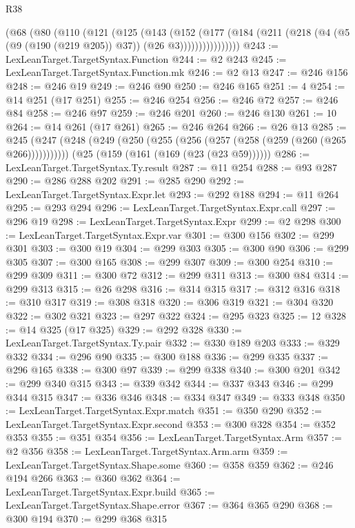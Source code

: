 \begin{lexlean}{R38}
\begin{coremodule}
          (@68
            (@80
              (@110
                (@121
                  (@125
                    (@143
                      (@152
                        (@177
                          (@184
                            (@211 (@218 (@4 (@5 (@9 (@190 (@219 @205)) @37)) (@26 @3))))))))))))))))
@243 := LexLeanTarget.TargetSyntax.Function
@244 := @2 @243
@245 := LexLeanTarget.TargetSyntax.Function.mk
@246 := @2 @13
@247 := @246 @156
@248 := @246 @19
@249 := @246 @90
@250 := @246 @165
@251 := 4
@254 := @14 @251 (@17 @251)
@255 := @246 @254
@256 := @246 @72
@257 := @246 @84
@258 := @246 @97
@259 := @246 @201
@260 := @246 @130
@261 := 10
@264 := @14 @261 (@17 @261)
@265 := @246 @264
@266 := @26 @13
@285 := @245
    (@247 (@248 (@249 (@250 (@255 (@256 (@257 (@258 (@259 (@260 (@265 @266)))))))))))
    (@25 (@159 (@161 (@169 (@23 (@23 @59))))))
@286 := LexLeanTarget.TargetSyntax.Ty.result
@287 := @11 @254
@288 := @93 @287
@290 := @286 @288 @202
@291 := @285 @290
@292 := LexLeanTarget.TargetSyntax.Expr.let
@293 := @292 @188
@294 := @11 @264
@295 := @293 @294
@296 := LexLeanTarget.TargetSyntax.Expr.call
@297 := @296 @19
@298 := LexLeanTarget.TargetSyntax.Expr
@299 := @2 @298
@300 := LexLeanTarget.TargetSyntax.Expr.var
@301 := @300 @156
@302 := @299 @301
@303 := @300 @19
@304 := @299 @303
@305 := @300 @90
@306 := @299 @305
@307 := @300 @165
@308 := @299 @307
@309 := @300 @254
@310 := @299 @309
@311 := @300 @72
@312 := @299 @311
@313 := @300 @84
@314 := @299 @313
@315 := @26 @298
@316 := @314 @315
@317 := @312 @316
@318 := @310 @317
@319 := @308 @318
@320 := @306 @319
@321 := @304 @320
@322 := @302 @321
@323 := @297 @322
@324 := @295 @323
@325 := 12
@328 := @14 @325 (@17 @325)
@329 := @292 @328
@330 := LexLeanTarget.TargetSyntax.Ty.pair
@332 := @330 @189 @203
@333 := @329 @332
@334 := @296 @90
@335 := @300 @188
@336 := @299 @335
@337 := @296 @165
@338 := @300 @97
@339 := @299 @338
@340 := @300 @201
@342 := @299 @340 @315
@343 := @339 @342
@344 := @337 @343
@346 := @299 @344 @315
@347 := @336 @346
@348 := @334 @347
@349 := @333 @348
@350 := LexLeanTarget.TargetSyntax.Expr.match
@351 := @350 @290
@352 := LexLeanTarget.TargetSyntax.Expr.second
@353 := @300 @328
@354 := @352 @353
@355 := @351 @354
@356 := LexLeanTarget.TargetSyntax.Arm
@357 := @2 @356
@358 := LexLeanTarget.TargetSyntax.Arm.arm
@359 := LexLeanTarget.TargetSyntax.Shape.some
@360 := @358 @359
@362 := @246 @194 @266
@363 := @360 @362
@364 := LexLeanTarget.TargetSyntax.Expr.build
@365 := LexLeanTarget.TargetSyntax.Shape.error
@367 := @364 @365 @290
@368 := @300 @194
@370 := @299 @368 @315

\end{coremodule}
\end{lexlean}
